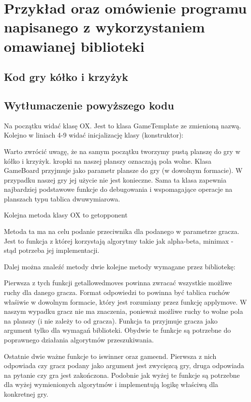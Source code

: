 \documentclass[declaration,shortabstract,inz]{iithesis}
\begin{document}
\section{Przykład oraz omówienie programu napisanego z wykorzystaniem omawianej biblioteki}
\subsection{Kod gry kółko i krzyżyk}

\subsection{Wytłumaczenie powyższego kodu}
Na początku widać klasę OX. Jest to klasa GameTemplate ze zmienioną nazwą.
Kolejno w liniach 4-9 widać inicjalizację klasy (konstruktor):

Warto zwrócić uwagę, że na samym początku tworzymy pustą planszę do gry w kółko i krzyżyk.
kropki na naszej planszy oznaczają pola wolne.
Klasa GameBoard przyjmuje jako parametr plansze do gry (w dowolnym formacie).
W przypadku naszej gry jej użycie nie jest konieczne.
Sama ta klasa zapewnia najbardziej podstawowe funkcje do debugowania i wspomagające operacje na planszach typu tablica dwuwymiarowa.

Kolejna metoda klasy OX to get\textunderscore opponent

Metoda ta ma na celu podanie przeciwnika dla podanego w parametrze gracza.
Jest to funkcja z której korzystają algorytmy takie jak alpha-beta, minimax - stąd potrzeba jej implementacji.

Dalej można znaleźć metody dwie kolejne metody wymagane przez bibliotekę:


Pierwsza z tych funkcji get\textunderscore allowed\textunderscore moves powinna zwracać wszystkie możliwe ruchy dla danego gracza.
Format odpowiedzi to powinna być tablica ruchów właśiwie w dowolnym formacie, który jest rozumiany przez funkcję apply\textunderscore move.
W naszym wypadku gracz nie ma znaczenia, ponieważ możliwe ruchy to wolne pola na planszy (i nie zależy to od gracza).
Funkcja ta przyjmuje gracza jako argument tylko dla wymagań biblioteki.
Obydwie te funkcje są potrzebne do poprawnego działania algorytmów przeszukiwania.

Ostatnie dwie ważne funkcje to is\textunderscore winner oraz game\textunderscore end.
Pierwsza z nich odpowiada czy gracz podany jako argument jest zwycięzcą gry, druga odpowiada na pytanie czy gra jest zakończona.
Podobnie jak wyżej te funkcje są potrzebne dla wyżej wymienionych algorytmów i implementują logikę właściwą dla konkretnej gry.
\end{document}
